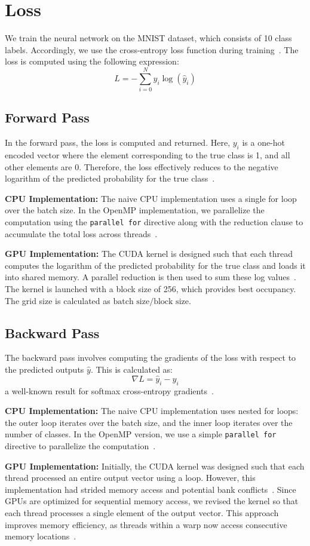 \section{Loss}

We train the neural network on the MNIST dataset, which consists of 10 class labels. Accordingly, we use the cross-entropy loss function during training~\cite{bishop2006pattern, goodfellow2016deep}. The loss is computed using the following expression:
\[
    L = -\sum_{i=0}^N y_i \log(\hat{y}_i)
\]

\subsection{Forward Pass}
In the forward pass, the loss is computed and returned. Here, \( y_i \) is a one-hot encoded vector where the element corresponding to the true class is 1, and all other elements are 0. Therefore, the loss effectively reduces to the negative logarithm of the predicted probability for the true class~\cite{goodfellow2016deep}.

\textbf{CPU Implementation:}  
The naive CPU implementation uses a single for loop over the batch size. In the OpenMP implementation, we parallelize the computation using the \texttt{parallel for} directive along with the reduction clause to accumulate the total loss across threads~\cite{stanford_xavier}.  

\textbf{GPU Implementation:}  
The CUDA kernel is designed such that each thread computes the logarithm of the predicted probability for the true class and loads it into shared memory. A parallel reduction is then used to sum these log values~\cite{nvidia_cudnn, digitalocean_gpu_opt}. The kernel is launched with a block size of 256, which provides best occupancy. The grid size is calculated as \(\text{batch size} / \text{block size}\).

\subsection{Backward Pass}
The backward pass involves computing the gradients of the loss with respect to the predicted outputs \( \hat{y} \). This is calculated as:
\[
    \nabla L = \hat{y}_i - y_i
\]
a well-known result for softmax cross-entropy gradients~\cite{goodfellow2016deep}.

\textbf{CPU Implementation:}
The naive CPU implementation uses nested for loops: the outer loop iterates over the batch size, and the inner loop iterates over the number of classes. In the OpenMP version, we use a simple \texttt{parallel for} directive to parallelize the computation~\cite{neptune_gpu_optimization}.

\textbf{GPU Implementation:}  
Initially, the CUDA kernel was designed such that each thread processed an entire output vector using a loop. However, this implementation had strided memory access and potential bank conflicts~\cite{aws_gpu_performance}. Since GPUs are optimized for sequential memory access, we revised the kernel so that each thread processes a single element of the output vector. This approach improves memory efficiency, as threads within a warp now access consecutive memory locations~\cite{nvidia_cudnn, digitalocean_gpu_opt}.
